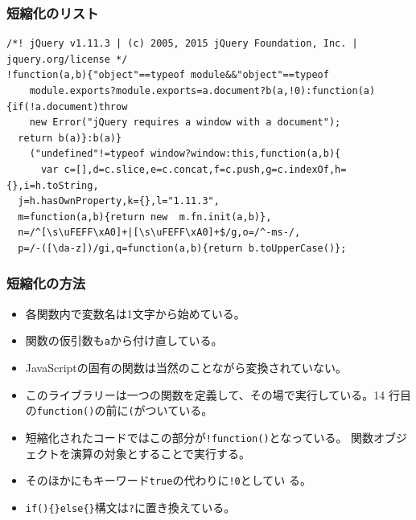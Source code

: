 \documentclass[dvipsk]{beamer}
\begin{document}
\begin{frame}[containsverbatim]
\frametitle{短縮化のリスト}
{\scriptsize
\begin{verbatim}
/*! jQuery v1.11.3 | (c) 2005, 2015 jQuery Foundation, Inc. | jquery.org/license */
!function(a,b){"object"==typeof module&&"object"==typeof
    module.exports?module.exports=a.document?b(a,!0):function(a){if(!a.document)throw
    new Error("jQuery requires a window with a document");
  return b(a)}:b(a)}
    ("undefined"!=typeof window?window:this,function(a,b){
      var c=[],d=c.slice,e=c.concat,f=c.push,g=c.indexOf,h={},i=h.toString,
  j=h.hasOwnProperty,k={},l="1.11.3",
  m=function(a,b){return new  m.fn.init(a,b)},
  n=/^[\s\uFEFF\xA0]+|[\s\uFEFF\xA0]+$/g,o=/^-ms-/,
  p=/-([\da-z])/gi,q=function(a,b){return b.toUpperCase()};
\end{verbatim}
}
\end{frame}
\begin{frame}[containsverbatim]
\frametitle{短縮化の方法}
\begin{itemize}
 \item 各関数内で変数名は1文字から始めている。
 \item 関数の仮引数も\texttt{a}から付け直している。
 \item JavaScriptの固有の関数は当然のことながら変換されていない。
 \item このライブラリーは一つの関数を定義して、その場で実行している。14
       行目の\texttt{function()}の前に\texttt{(}がついている。
 \item 短縮化されたコードではこの部分が\texttt{!function()}となっている。
       関数オブジェクトを演算の対象とすることで実行する。
 \item そのほかにもキーワード\texttt{true}の代わりに\texttt{!0}としてい
       る。
 \item \texttt{if()\{\}else\{\}}構文は\texttt{?}に置き換えている。
\end{itemize}
\end{frame}
\end{document}
